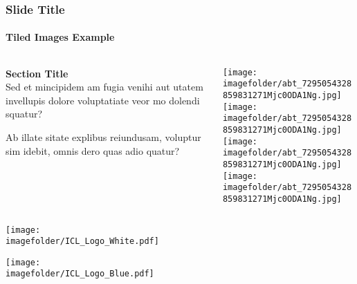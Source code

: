 \documentclass[
	aspectratio=169, %
	t, %
	onlytextwidth, %
	10pt, %
]{beamer}
\def\imagefolder{../ImperialTheme/Images/}
\begin{document}

\begin{frame}
	\frametitle{Slide Title}
	\framesubtitle{Tiled Images Example}
	
	\small %
	
	\begin{columns}[T] %
		\begin{column}{0.3\linewidth} %
			\textbf{Section Title}\\
			Sed et mincipidem am fugia venihi aut utatem invellupis dolore voluptatiate veor mo dolendi squatur?

			Ab illate sitate explibus reiundusam, voluptur sim idebit, omnis dero quas adio quatur?
		\end{column}
		\begin{column}{0.68\linewidth} %
			\vspace{-3.5\baselineskip} %
			
			\texttt{[image: \\imagefolder/abt\_7295054328859831271Mjc0ODA1Ng.jpg]}\hfill\texttt{[image: \\imagefolder/abt\_7295054328859831271Mjc0ODA1Ng.jpg]}\\[4pt]
			\texttt{[image: \\imagefolder/abt\_7295054328859831271Mjc0ODA1Ng.jpg]}\hfill\texttt{[image: \\imagefolder/abt\_7295054328859831271Mjc0ODA1Ng.jpg]}\par
		\end{column}
	\end{columns}
\end{frame}


\begingroup
	
	\begin{frame}[plain] %
		\medskip %
		\centering %
		\texttt{[image: \\imagefolder/ICL\_Logo\_White.pdf]}
	\end{frame}
\endgroup


\begin{frame}[plain] %
	\medskip %
	\centering %
	\texttt{[image: \\imagefolder/ICL\_Logo\_Blue.pdf]}
\end{frame}
\end{document}
